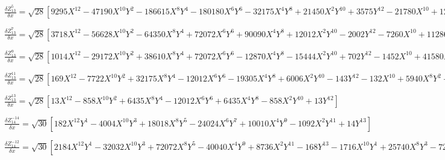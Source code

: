 \documentclass[10pt,landscape]{article}
\begin{document}
\vspace{1.2 mm}
\noindent $ \frac{\delta Z^{5}_{13}}{\delta x} = \sqrt{28} [9295X^{12} -47190X^{10}Y^{2} -186615X^{8}Y^{4} -180180X^{6}Y^{6} -32175X^{4}Y^{8} +21450X^{2}Y^{10} +3575Y^{12} -21780X^{10} +124740X^{8}Y^{2} +304920X^{6}Y^{4} +138600X^{4}Y^{6} -29700X^{2}Y^{8} -9900Y^{10} +17820X^{8} -110880X^{6}Y^{2} -138600X^{4}Y^{4} +9900Y^{8} -5880X^{6} +37800X^{4}Y^{2} +12600X^{2}Y^{4} -4200Y^{6} +630X^{4} -3780X^{2}Y^{2} +630Y^{4}] $

\vspace{1.2 mm}
\noindent $ \frac{\delta Z^{7}_{13}}{\delta x} = \sqrt{28} [3718X^{12} -56628X^{10}Y^{2} -64350X^{8}Y^{4} +72072X^{6}Y^{6} +90090X^{4}Y^{8} +12012X^{2}Y^{10} -2002Y^{12} -7260X^{10} +112860X^{8}Y^{2} +27720X^{6}Y^{4} -138600X^{4}Y^{6} -41580X^{2}Y^{8} +4620Y^{10} +4455X^{8} -69300X^{6}Y^{2} +34650X^{4}Y^{4} +41580X^{2}Y^{6} -3465Y^{8} -840X^{6} +12600X^{4}Y^{2} -12600X^{2}Y^{4} +840Y^{6}] $

\vspace{1.2 mm}
\noindent $ \frac{\delta Z^{9}_{13}}{\delta x} = \sqrt{28} [1014X^{12} -29172X^{10}Y^{2} +38610X^{8}Y^{4} +72072X^{6}Y^{6} -12870X^{4}Y^{8} -15444X^{2}Y^{10} +702Y^{12} -1452X^{10} +41580X^{8}Y^{2} -83160X^{6}Y^{4} -27720X^{4}Y^{6} +29700X^{2}Y^{8} -1188Y^{10} +495X^{8} -13860X^{6}Y^{2} +34650X^{4}Y^{4} -13860X^{2}Y^{6} +495Y^{8}] $

\vspace{1.2 mm}
\noindent $ \frac{\delta Z^{11}_{13}}{\delta x} = \sqrt{28} [169X^{12} -7722X^{10}Y^{2} +32175X^{8}Y^{4} -12012X^{6}Y^{6} -19305X^{4}Y^{8} +6006X^{2}Y^{10} -143Y^{12} -132X^{10} +5940X^{8}Y^{2} -27720X^{6}Y^{4} +27720X^{4}Y^{6} -5940X^{2}Y^{8} +132Y^{10}] $

\vspace{1.2 mm}
\noindent $ \frac{\delta Z^{13}_{13}}{\delta x} = \sqrt{28} [13X^{12} -858X^{10}Y^{2} +6435X^{8}Y^{4} -12012X^{6}Y^{6} +6435X^{4}Y^{8} -858X^{2}Y^{10} +13Y^{12}] $

\vspace{1.2 mm}
\noindent $ \frac{\delta Z^{-14}_{14}}{\delta x} = \sqrt{30} [182X^{12}Y^{1} -4004X^{10}Y^{3} +18018X^{8}Y^{5} -24024X^{6}Y^{7} +10010X^{4}Y^{9} -1092X^{2}Y^{11} +14Y^{13}] $

\vspace{1.2 mm}
\noindent $ \frac{\delta Z^{-12}_{14}}{\delta x} = \sqrt{30} [2184X^{12}Y^{1} -32032X^{10}Y^{3} +72072X^{8}Y^{5} -40040X^{4}Y^{9} +8736X^{2}Y^{11} -168Y^{13} -1716X^{10}Y^{1} +25740X^{8}Y^{3} -72072X^{6}Y^{5} +51480X^{4}Y^{7} -8580X^{2}Y^{9} +156Y^{11}] $
\end{document}
